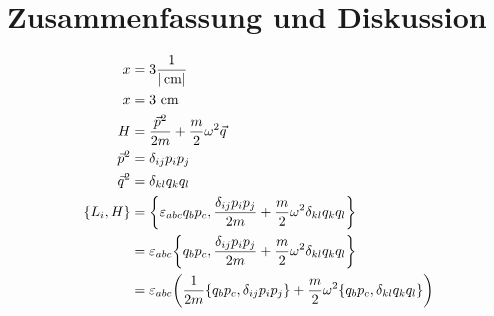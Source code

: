 \section{Zusammenfassung und Diskussion}

\begin{align}
  x &= 3 \frac{1}{|\text{\,cm}|}\\
  x &= 3 \text{ cm}\\
  H &= \frac{\vec{p}^2}{2m}+ \frac{m}{2} \omega^2 \vec{q}\\
  \vec{p}^2 &= \delta_{ij} p_i p_j\\
  \vec{q}^2 &= \delta_{kl} q_k q_l\\
  \qty{L_i, H} &=\qty{\varepsilon_{abc} q_b p_c, \frac{\delta_{ij} p_i p_j}{2m}+ \frac{m}{2} \omega^2 \delta_{kl} q_k q_l}\\
  &= \varepsilon_{abc} \qty{q_b p_c, \frac{\delta_{ij} p_i p_j}{2m}+ \frac{m}{2} \omega^2 \delta_{kl} q_k q_l}\\
  &= \varepsilon_{abc} \qty(\frac{1}{2m} \qty{q_b p_c, \delta_{ij} p_i p_j} + \frac{m}{2} \omega^2 \qty{q_b p_c, \delta_{kl} q_k q_l})\\
\end{align}